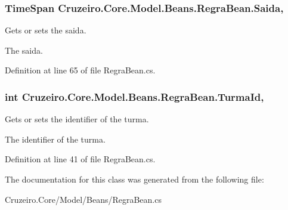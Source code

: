 \subsubsection[{\texorpdfstring{Saida}{Saida}}]{\setlength{\rightskip}{0pt plus 5cm}Time\+Span Cruzeiro.\+Core.\+Model.\+Beans.\+Regra\+Bean.\+Saida\hspace{0.3cm}{\ttfamily [get]}, {\ttfamily [set]}}\hypertarget{class_cruzeiro_1_1_core_1_1_model_1_1_beans_1_1_regra_bean_accb745dad1eb5ea8cff30ad84bf2e841}{}\label{class_cruzeiro_1_1_core_1_1_model_1_1_beans_1_1_regra_bean_accb745dad1eb5ea8cff30ad84bf2e841}


Gets or sets the saida. 

The saida. 

Definition at line 65 of file Regra\+Bean.\+cs.

\subsubsection[{\texorpdfstring{Turma\+Id}{TurmaId}}]{\setlength{\rightskip}{0pt plus 5cm}int Cruzeiro.\+Core.\+Model.\+Beans.\+Regra\+Bean.\+Turma\+Id\hspace{0.3cm}{\ttfamily [get]}, {\ttfamily [set]}}\hypertarget{class_cruzeiro_1_1_core_1_1_model_1_1_beans_1_1_regra_bean_a63c53c78ae9a36c2ed677d4f71206c8b}{}\label{class_cruzeiro_1_1_core_1_1_model_1_1_beans_1_1_regra_bean_a63c53c78ae9a36c2ed677d4f71206c8b}


Gets or sets the identifier of the turma. 

The identifier of the turma. 

Definition at line 41 of file Regra\+Bean.\+cs.



The documentation for this class was generated from the following file\+:\begin{DoxyCompactItemize}
\item 
Cruzeiro.\+Core/\+Model/\+Beans/Regra\+Bean.\+cs\end{DoxyCompactItemize}
